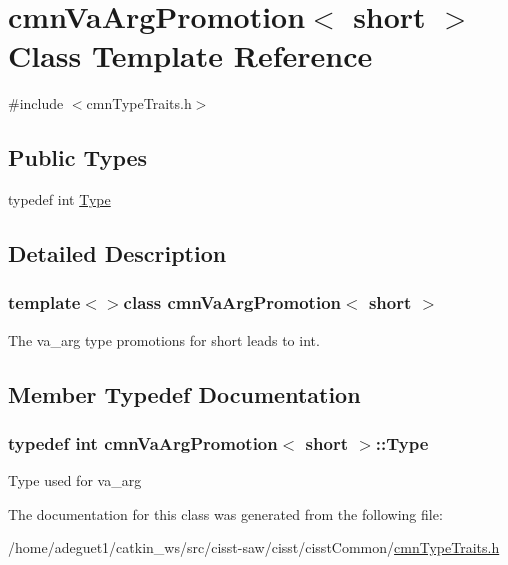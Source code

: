\hypertarget{classcmn_va_arg_promotion_3_01short_01_4}{\section{cmn\-Va\-Arg\-Promotion$<$ short $>$ Class Template Reference}
\label{classcmn_va_arg_promotion_3_01short_01_4}
}


{\ttfamily \#include $<$cmn\-Type\-Traits.\-h$>$}

\subsection*{Public Types}
\begin{DoxyCompactItemize}
\item 
typedef int \hyperlink{classcmn_va_arg_promotion_3_01short_01_4_abea9f2b044faa4608e492ccb14a4282c}{Type}
\end{DoxyCompactItemize}


\subsection{Detailed Description}
\subsubsection*{template$<$$>$class cmn\-Va\-Arg\-Promotion$<$ short $>$}

The va\-\_\-arg type promotions for short leads to int. 

\subsection{Member Typedef Documentation}
\hypertarget{classcmn_va_arg_promotion_3_01short_01_4_abea9f2b044faa4608e492ccb14a4282c}{
\subsubsection[{Type}]{\setlength{\rightskip}{0pt plus 5cm}typedef int {\bf cmn\-Va\-Arg\-Promotion}$<$ short $>$\-::{\bf Type}}}\label{classcmn_va_arg_promotion_3_01short_01_4_abea9f2b044faa4608e492ccb14a4282c}
Type used for va\-\_\-arg 

The documentation for this class was generated from the following file\-:\begin{DoxyCompactItemize}
\item 
/home/adeguet1/catkin\-\_\-ws/src/cisst-\/saw/cisst/cisst\-Common/\hyperlink{cmn_type_traits_8h}{cmn\-Type\-Traits.\-h}\end{DoxyCompactItemize}
